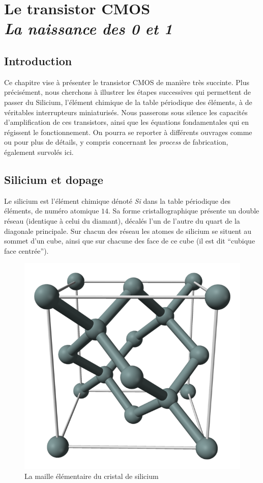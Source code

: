 \chapter[Le transistor]{Le transistor CMOS\\{\it La naissance des 0 et 1}}

\minitoc

\section{Introduction}
Ce chapitre vise à présenter le transistor CMOS de manière très succinte. Plus précisément, nous cherchons à illustrer les étapes successives qui permettent
de passer du Silicium,  l'élément chimique de la table périodique des éléments, à de véritables interrupteurs miniaturisés. Nous passerons sous silence
les capacités d'amplification de ces transistors, ainsi que les équations fondamentales qui en régissent le fonctionnement. On pourra se reporter à différents
ouvrages comme \cite{weste} ou \cite{ngo} pour plus de détails, y compris concernant les {\it process} de fabrication, également survolés ici.

\section{Silicium et dopage}
Le silicium  est l'élément chimique dénoté {\it Si} dans la table périodique des éléments, de numéro atomique $14$.
Sa forme cristallographique présente un double réseau (identique à celui du diamant), décalés l'un de l'autre du quart de la diagonale principale. Sur chacun des réseau les atomes de silicium se situent au sommet d'un cube, ainsi que sur chacune des face de ce cube (il est dit ``cubique face centrée'').

\begin{figure}[htb]
\begin{center}
\includegraphics[scale=0.15]{figures/double_fc.png}
\caption{La maille élémentaire du cristal de silicium}
\end{center}
\end{figure}

